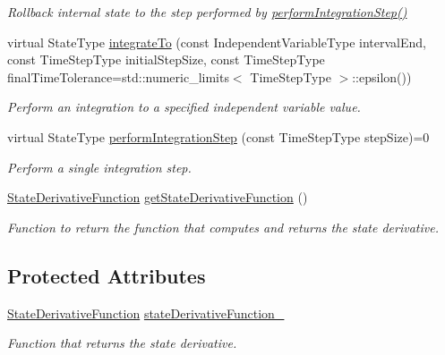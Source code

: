 \begin{DoxyCompactItemize}
\begin{DoxyCompactList}\small\item\em Rollback internal state to the step performed by \hyperlink{classtudat_1_1numerical__integrators_1_1NumericalIntegrator_a125da80be4a16cd933707212caefe8a5}{perform\+Integration\+Step()} \end{DoxyCompactList}\item 
virtual State\+Type \hyperlink{classtudat_1_1numerical__integrators_1_1NumericalIntegrator_aed0dfa86d274bd9e71c2fd6428edfd3e}{integrate\+To} (const Independent\+Variable\+Type interval\+End, const Time\+Step\+Type initial\+Step\+Size, const Time\+Step\+Type final\+Time\+Tolerance=std\+::numeric\+\_\+limits$<$ Time\+Step\+Type $>$\+::epsilon())
\begin{DoxyCompactList}\small\item\em Perform an integration to a specified independent variable value. \end{DoxyCompactList}\item 
virtual State\+Type \hyperlink{classtudat_1_1numerical__integrators_1_1NumericalIntegrator_a125da80be4a16cd933707212caefe8a5}{perform\+Integration\+Step} (const Time\+Step\+Type step\+Size)=0
\begin{DoxyCompactList}\small\item\em Perform a single integration step. \end{DoxyCompactList}\item 
\hyperlink{classtudat_1_1numerical__integrators_1_1NumericalIntegrator_a0d0a5d48ebaf1f5ad9cd7a73b44be0fc}{State\+Derivative\+Function} \hyperlink{classtudat_1_1numerical__integrators_1_1NumericalIntegrator_abe7509347b34000520da61da0e090c47}{get\+State\+Derivative\+Function} ()
\begin{DoxyCompactList}\small\item\em Function to return the function that computes and returns the state derivative. \end{DoxyCompactList}\end{DoxyCompactItemize}
\subsection*{Protected Attributes}
\begin{DoxyCompactItemize}
\item 
\hyperlink{classtudat_1_1numerical__integrators_1_1NumericalIntegrator_a0d0a5d48ebaf1f5ad9cd7a73b44be0fc}{State\+Derivative\+Function} \hyperlink{classtudat_1_1numerical__integrators_1_1NumericalIntegrator_a9da0d5b84797f0f84783447c6b6cffcf}{state\+Derivative\+Function\+\_\+}
\begin{DoxyCompactList}\small\item\em Function that returns the state derivative. \end{DoxyCompactList}\end{DoxyCompactItemize}


